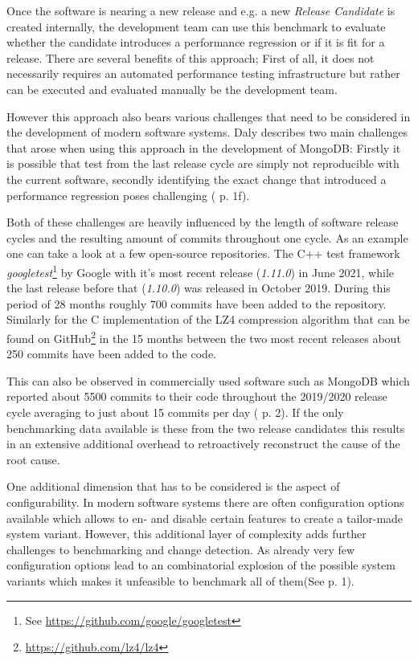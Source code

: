 \documentclass[	runningheads,
				a4paper]{llncs}
\begin{document}
	Once the software is nearing a new release and e.g. a new \textit{Release Candidate} is created internally, the development team can use this benchmark to evaluate whether the candidate introduces a performance regression or if it is fit for a release. There are several benefits of this approach; First of all, it does not necessarily requires an automated performance testing infrastructure but rather can be executed and evaluated manually be the development team. 

	However this approach also bears various challenges that need to be considered in the development of modern software systems. Daly describes two main challenges that arose when using this approach in the development of MongoDB: Firstly it is possible that test from the last release cycle are simply not reproducible with the current software, secondly identifying the exact change that introduced a performance regression poses challenging (\cite{daly2021} p. 1f).

	Both of these challenges are heavily influenced by the length of software release cycles and the resulting amount of commits throughout one cycle. As an example one can take a look at a few open-source repositories. The C++ test framework \textit{googletest}\footnote{See \url{https://github.com/google/googletest}} by Google with it's most recent release (\textit{1.11.0}) in June 2021, while the last release before that (\textit{1.10.0}) was released in October 2019. During this period of 28 months roughly 700 commits have been added to the repository. Similarly for the C implementation of the LZ4 compression algorithm that can be found on GitHub\footnote{\url{https://github.com/lz4/lz4}} in the 15 months between the two most recent releases about 250 commits have been added to the code.

	This can also be observed in commercially used software such as MongoDB which reported about 5500 commits to their code throughout the 2019/2020 release cycle averaging to just about 15 commits per day (\cite{daly2021} p. 2). If the only benchmarking data available is these from the two release candidates this results in an extensive additional overhead to retroactively reconstruct the cause of the root cause.

	One additional dimension that has to be considered is the aspect of configurability. In modern software systems there are often configuration options available which allows to en- and disable certain features to create a tailor-made system variant. However, this additional layer of complexity adds further challenges to benchmarking and change detection. As already very few configuration options lead to an combinatorial explosion of the possible system variants which makes it unfeasible to benchmark all of them(See \cite{apel2020} p. 1).
\end{document}
